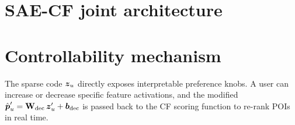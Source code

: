 \section{SAE-CF joint architecture}


\section{Controllability mechanism}

The sparse code $\boldsymbol{z}_u$ directly exposes interpretable preference knobs.
A user can increase or decrease specific feature activations, and the modified
$\hat{\boldsymbol{p}}_u' = \mathbf{W}_{\text{dec}}\,\boldsymbol{z}_u' + \boldsymbol{b}_{\text{dec}}$
is passed back to the CF scoring function to re-rank POIs in real time.
